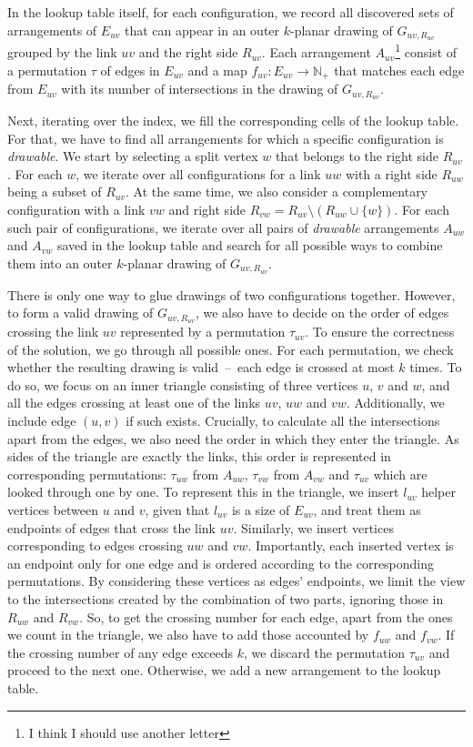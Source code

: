 In the lookup table itself, for each configuration, we record all discovered sets of arrangements of \(E_{uv}\) that can appear in an outer \(k\)-planar drawing of \(G_{uv, R_{uv}}\) grouped by the link \(uv\) and the right side \(R_{uv}\). Each arrangement \(A_{uv}\)\footnote{I think I should use another letter} consist of a permutation \(\tau\) of edges in \(E_{uv}\) and a map \(f_{uv}:E_{uv}\rightarrow \mathbb{N}_+\) that matches each edge from \(E_{uv}\) with its number of intersections in the drawing of \(G_{uv, R_{uv}}\).

Next, iterating over the index, we fill the corresponding cells of the lookup table. For that, we have to find all arrangements for which a specific configuration is \emph{drawable}. We start by selecting a split vertex \(w\) that belongs to the right side \(R_{uv}\). For each \(w\), we iterate over all configurations for a link \(uw\) with a right side \(R_{uw}\) being a subset of \(R_{uv}\). At the same time, we also consider a complementary configuration with a link \(vw\) and right side \(R_{vw} = R_{uv} \setminus (R_{uw} \cup \{w\})\). For each such pair of configurations, we iterate over all pairs of \emph{drawable} arrangements \(A_{uw}\) and \(A_{vw}\) saved in the lookup table and search for all possible ways to combine them into an outer \(k\)-planar drawing of \(G_{uv, R_{uv}}\).

There is only one way to glue drawings of two configurations together. However, to form a valid drawing of \(G_{uv, R_{uv}}\), we also have to decide on the order of edges crossing the link \(uv\) represented by a permutation \(\tau_{uv}\). To ensure the correctness of the solution, we go through all possible ones. For each permutation, we check whether the resulting drawing is valid~--~each edge is crossed at most \(k\) times. To do so, we focus on an inner triangle consisting of three vertices \(u\), \(v\) and \(w\), and all the edges crossing at least one of the links \(uv\), \(uw\) and \(vw\). Additionally, we include edge \((u, v)\) if such exists. Crucially, to calculate all the intersections apart from the edges, we also need the order in which they enter the triangle. As sides of the triangle are exactly the links, this order is represented in corresponding permutations: \(\tau_{uw}\) from \(A_{uw}\), \(\tau_{vw}\) from \(A_{vw}\) and \(\tau_{uv}\) which are looked through one by one. To represent this in the triangle, we insert \(l_{uv}\) helper vertices between \(u\) and \(v\), given that \(l_{uv}\) is a size of \(E_{uv}\), and treat them as endpoints of edges that cross the link \(uv\). Similarly, we insert vertices corresponding to edges crossing \(uw\) and \(vw\). Importantly, each inserted vertex is an endpoint only for one edge and is ordered according to the corresponding permutations. By considering these vertices as edges' endpoints, we limit the view to the intersections created by the combination of two parts, ignoring those in \(R_{uw}\) and \(R_{vw}\). So, to get the crossing number for each edge, apart from the ones we count in the triangle, we also have to add those accounted by \(f_{uw}\) and \(f_{vw}\). If the crossing number of any edge exceeds \(k\), we discard the permutation \(\tau_{uv}\) and proceed to the next one. Otherwise, we add a new arrangement to the lookup table.

